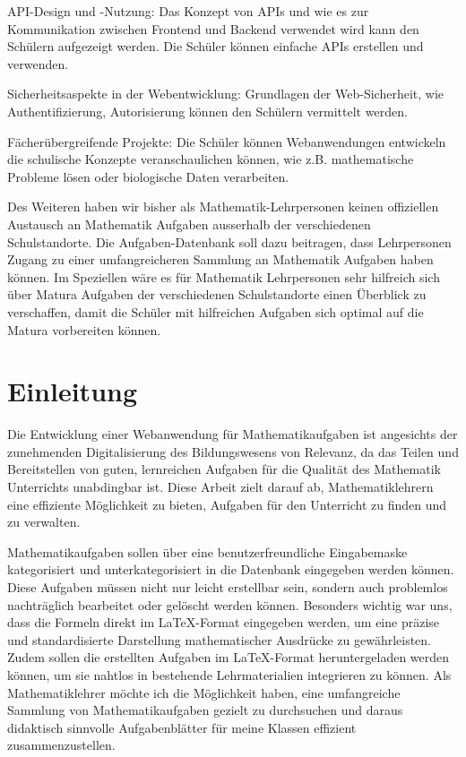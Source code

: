 \documentclass[12pt,a4paper]{article} %
\begin{document}
API-Design und -Nutzung: Das Konzept von APIs und wie es zur Kommunikation zwischen Frontend und Backend verwendet wird kann den Schülern aufgezeigt werden. Die Schüler können einfache APIs erstellen und verwenden.

Sicherheitsaspekte in der Webentwicklung: Grundlagen der Web-Sicherheit, wie Authentifizierung, Autorisierung können den Schülern vermittelt werden.

Fächerübergreifende Projekte: Die Schüler können Webanwendungen entwickeln die schulische Konzepte veranschaulichen können, wie z.B. mathematische Probleme lösen oder biologische Daten verarbeiten.

Des Weiteren haben wir bisher als Mathematik-Lehrpersonen keinen offiziellen Austausch an Mathematik Aufgaben ausserhalb der verschiedenen Schulstandorte. Die Aufgaben-Datenbank soll dazu beitragen, dass Lehrpersonen Zugang zu einer umfangreicheren Sammlung an Mathematik Aufgaben haben können. Im Speziellen wäre es für Mathematik Lehrpersonen sehr hilfreich sich über Matura Aufgaben der verschiedenen Schulstandorte einen Überblick zu verschaffen, damit die Schüler mit hilfreichen Aufgaben sich optimal auf die Matura vorbereiten können.



\section{Einleitung}
Die Entwicklung einer Webanwendung für Mathematikaufgaben ist angesichts der zunehmenden Digitalisierung des Bildungswesens von Relevanz, da das Teilen und Bereitstellen von guten, lernreichen Aufgaben für die Qualität des Mathematik Unterrichts unabdingbar ist. Diese Arbeit zielt darauf ab, Mathematiklehrern eine effiziente Möglichkeit zu bieten, Aufgaben für den Unterricht zu finden und zu verwalten.


Mathematikaufgaben sollen über eine benutzerfreundliche Eingabemaske kategorisiert und unterkategorisiert in die Datenbank eingegeben werden können. Diese Aufgaben müssen nicht nur leicht erstellbar sein, sondern auch problemlos nachträglich bearbeitet oder gelöscht werden können. Besonders wichtig war uns, dass die Formeln direkt im LaTeX-Format eingegeben werden, um eine präzise und standardisierte Darstellung mathematischer Ausdrücke zu gewährleisten. Zudem sollen die erstellten Aufgaben im LaTeX-Format heruntergeladen werden können, um sie nahtlos in bestehende Lehrmaterialien integrieren zu können. Als Mathematiklehrer möchte ich die Möglichkeit haben, eine umfangreiche Sammlung von Mathematikaufgaben gezielt zu durchsuchen und daraus didaktisch sinnvolle Aufgabenblätter für meine Klassen effizient zusammenzustellen.
\end{document}
